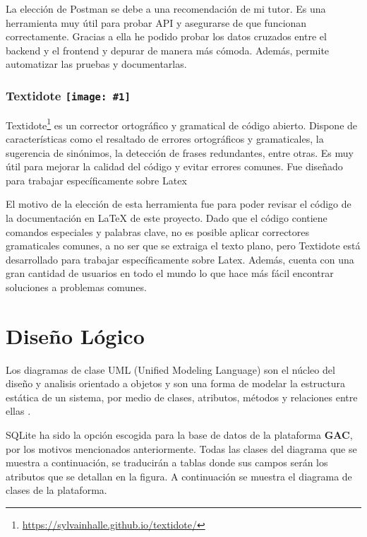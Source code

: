La elección de Postman se debe a una recomendación de mi tutor. Es una herramienta muy útil para probar API y asegurarse de que funcionan correctamente. Gracias a ella he podido probar los datos cruzados entre el backend y el frontend y depurar de manera más cómoda. Además, permite automatizar las pruebas y documentarlas.\newline

\renewcommand{\icon}[1]{\texttt{[image: \#1]}}
\subsubsection*{Textidote \protect\icon{./imagenes/textidote_logo.png}}



Textidote\footnote{\url{https://sylvainhalle.github.io/textidote/}} es un corrector ortográfico y gramatical de código abierto. Dispone de características como el resaltado de errores ortográficos y gramaticales, la sugerencia de sinónimos, la detección de frases redundantes, entre otras. Es muy útil para mejorar la calidad del código y evitar errores comunes. Fue diseñado para trabajar específicamente sobre Latex\newline

El motivo de la elección de esta herramienta fue para poder revisar el código de la documentación en LaTeX de este proyecto. Dado que el código contiene comandos especiales y palabras clave, no es posible aplicar correctores gramaticales comunes, a no ser que se extraiga el texto plano, pero Textidote está desarrollado para trabajar específicamente sobre Latex. Además, cuenta con una gran cantidad de usuarios en todo el mundo lo que hace más fácil encontrar soluciones a problemas comunes.\newline

\section{Diseño Lógico}

Los diagramas de clase UML (Unified Modeling Language) son el núcleo del diseño y analisis orientado a objetos y son una forma de modelar la estructura estática de un sistema, por medio de clases, atributos, métodos y relaciones entre ellas \cite{herchi2012user}.\newline

SQLite ha sido la opción escogida para la base de datos de la plataforma \textbf{GAC}, por los motivos mencionados anteriormente. Todas las clases del diagrama que se muestra a continuación, se traducirán a tablas donde sus campos serán los atributos que se detallan en la figura. A continuación se muestra el diagrama de clases de la plataforma.\newline

